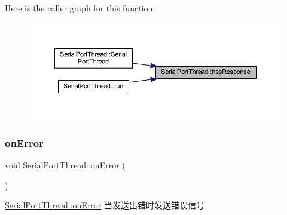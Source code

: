 Here is the caller graph for this function\+:
\nopagebreak
\begin{figure}[H]
\begin{center}
\leavevmode
\includegraphics[width=350pt]{class_serial_port_thread_aa052196772f8d1a3066030c4b10eb18d_icgraph}
\end{center}
\end{figure}
\mbox{\label{class_serial_port_thread_a1f0e27279ed5e305f0f71caec3a835f8}} 
\subsubsection{\texorpdfstring{onError}{onError}}
{\footnotesize\ttfamily void Serial\+Port\+Thread\+::on\+Error (\begin{DoxyParamCaption}{ }\end{DoxyParamCaption})\hspace{0.3cm}{\ttfamily [slot]}}



\mbox{\hyperlink{class_serial_port_thread_a1f0e27279ed5e305f0f71caec3a835f8}{Serial\+Port\+Thread\+::on\+Error}} 当发送出错时发送错误信号 

